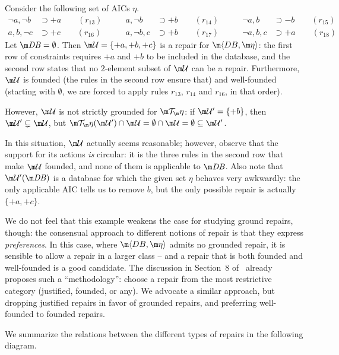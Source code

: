 \begin{example}
  Consider the following set of AICs $\eta$.
  \begin{align*}
    \neg a,\neg b&\supset{+a} \qquad (r_{13}) \qquad &
    a,\neg b&\supset{+b} \qquad (r_{14}) \qquad &
    \neg a,b&\supset{-b} \qquad (r_{15}) \\
    a,b,\neg c&\supset{+c} \qquad (r_{16}) \qquad &
    a,\neg b,c&\supset{+b} \qquad (r_{17}) \qquad &
    \neg a,b,c&\supset{+a}\qquad (r_{18})
  \end{align*}
  Let $\db=\emptyset$.
  Then $\UU=\{{+a},{+b},{+c}\}$ is a repair for $\fulldb$: the first row of constraints requires ${+a}$ and ${+b}$ to be included in the database, and the second row states that no $2$-element subset of $\UU$ can be a repair.
  Furthermore, $\UU$ is founded (the rules in the second row ensure that) and well-founded (starting with $\emptyset$, we are forced to apply rules $r_{13}$, $r_{14}$ and $r_{16}$, in that order).

  However, $\UU$ is not strictly grounded for $\Op$: if $\UU'=\{{+b}\}$, then $\UU'\subsetneq\UU$, but $\Op(\UU')\cap\UU=\emptyset\cap\UU=\emptyset\subseteq\UU'$.
\end{example}
In this situation, $\UU$ actually seems reasonable; however, observe that the support for its actions \emph{is} circular: it is the three rules in the second row that make $\UU$ founded, and none of them is applicable to $\db$.
Also note that $\UU'(\db)$ is a database for which the given set $\eta$ behaves very awkwardly: the only applicable AIC tells us to remove $b$, but the only possible repair is actually $\{{+a},{+c}\}$.

We do not feel that this example weakens the case for studying ground repairs, though: the consensual approach to different notions of repair is that they express \emph{preferences}.
In this case, where $\fulldb$ admits no grounded repair, it is sensible to allow a repair in a larger class -- and a repair that is both founded and well-founded is a good candidate.
The discussion in Section~8 of~\cite{Caroprese2011} already proposes such a ``methodology'': choose a repair from the most restrictive category (justified, founded, or any).
We advocate a similar approach, but dropping justified repairs in favor of grounded repairs, and preferring well-founded to founded repairs.

We summarize the relations between the different types of repairs in the following diagram.

